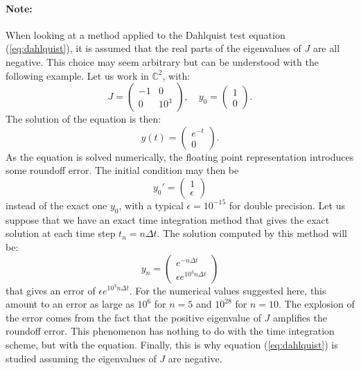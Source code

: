         \paragraph{Note:}
        When looking at a method applied to the Dahlquist test equation (\ref{eq:dahlquist}), it is assumed that the real parts of the eigenvalues of $J$ are all negative.
        This choice may seem arbitrary but can be understood with the following example.
        Let us work in $\mathbb{C}^2$, with:
        \begin{equation}
          J = \begin{pmatrix} -1 & 0 \\ 0 & 10^3 \end{pmatrix}, \quad y_0 = \begin{pmatrix} 1 \\ 0 \end{pmatrix} .
        \end{equation}
        The solution of the equation is then:
        \begin{equation}
          y\left(t\right) = \begin{pmatrix} e^{-t} \\ 0 \end{pmatrix} .
        \end{equation}
        As the equation is solved numerically, the floating point representation introduces some roundoff error.
        The initial condition may then be
        \begin{equation}
          y_0' = \begin{pmatrix} 1 \\ \epsilon \end{pmatrix}
        \end{equation}
        instead of the exact one $y_0$, with a typical $\epsilon = 10^{-15}$ for double precision.
        Let us suppose that we have an exact time integration method that gives the exact solution at each time step $t_n = n\Delta t$.
        The solution computed by this method will be:
        \begin{equation}
          y_n = \begin{pmatrix} e^{-n\Delta t} \\ \epsilon e^{10^3 n \Delta t} \end{pmatrix}
        \end{equation}
        that gives an error of $\epsilon e^{10^3 n\Delta t}$.
        For the numerical values suggested here, this amount to an error as large as $10^6$ for $n = 5$ and $10^{28}$ for $n = 10$.
        The explosion of the error comes from the fact that the positive eigenvalue of $J$ amplifies the roundoff error.
        This phenomenon has nothing to do with the time integration scheme, but with the equation.
        Finally, this is why equation (\ref{eq:dahlquist}) is studied assuming the eigenvalues of $J$ are negative.


